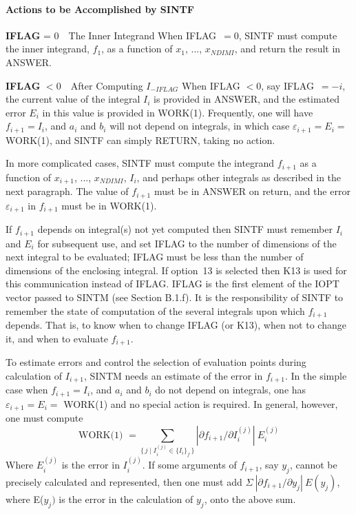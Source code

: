 \documentclass[twoside]{MATH77}
\begin{document}
\paragraph{Actions to be Accomplished by SINTF\label{ActSINTF}}

{\bf IFLAG} = 0\ \ The Inner Integrand\newline
When IFLAG\ $= 0$, SINTF must compute the inner integrand, $f_1$, as a
function of $x_1$, ..., $x_{NDIMI}$, and return the result in ANSWER.

{\bf IFLAG} $< 0$\ \ After Computing $I_{-IFLAG}$\newline
When IFLAG $< 0$, say IFLAG\ $= -i$, the current value of the integral
$I_i$ is provided in ANSWER, and the estimated error $E_i$ in this value
is provided in WORK(1). Frequently, one will have $f_{i+1} = I_i$, and
$a_i$ and $b_i$ will not depend on integrals, in which case
$\varepsilon_{i+1} = E_i = $ WORK(1), and SINTF can simply RETURN, taking
no action.

In more complicated cases, SINTF must compute the integrand $f_{i+1}$ as a
function of $x_{i+1}$, ..., $x_{NDIMI}$, $I_i$, and perhaps other
integrals as described in the next paragraph. The value of $f_{i+1}$ must
be in ANSWER on return, and the error $\varepsilon _{i+1}$ in $f_{i+1}$
must be in WORK(1).

If $f_{i+1}$ depends on integral(s) not yet computed then SINTF must
remember $I_i$ and $E_i$ for subsequent use, and set IFLAG to the number of
dimensions of the next integral to be evaluated; IFLAG must be less than the
number of dimensions of the enclosing integral. If option~13 is selected
then K13 is used for this communication instead of IFLAG. IFLAG is the first
element of the IOPT vector passed to SINTM (see Section B.1.f). It is the
responsibility of SINTF to remember the state of computation of the several
integrals upon which $f_{i+1}$ depends. That is, to know when to change
IFLAG (or K13), when not to change it, and when to evaluate $f_{i+1}.$

To estimate errors and control the selection of evaluation points during
calculation of $I_{i+1}$, SINTM needs an estimate of the error in
$f_{i+1}$. In the simple case when $f_{i+1}=I_i$, and $a_i$ and $b_i$ do
not depend on integrals, one has $\varepsilon _{i+1}=E_i=$ WORK(1) and no
special action is required. In general, however, one must compute%
\begin{equation*}
\text{WORK(1) }=\sum_{\{\,j\mid I_i^{(j)}\in \{I_i\}_f\,\}}|\partial
f_{i+1}/\partial I_i^{(j)}|\ E_i^{(j)}
\end{equation*}
Where $E_i^{(j)}$ is the error in $I_i^{(j)}$. If some arguments of
$f_{i+1}$, say $y_j$, cannot be precisely calculated and represented, then
one must add $\Sigma \ |\partial f_{i+1}/\partial y_j|\ E(y_j)$, where
E($y_j)$ is the error in the calculation of $y_j$, onto the above sum.
\end{document}
